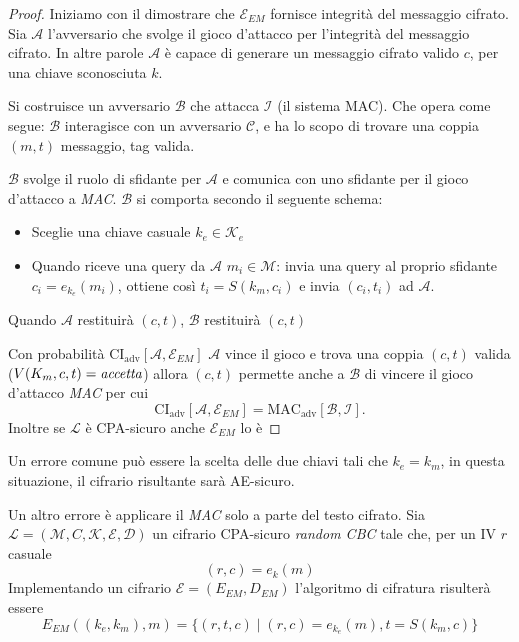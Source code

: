 \begin{proof}
    Iniziamo con il dimostrare che $\mathcal{E}_{EM}$ fornisce integrità del messaggio cifrato. Sia $\mathcal{A}$ l'avversario che svolge il gioco d'attacco per l'integrità del messaggio cifrato. In altre parole $\mathcal{A}$ è capace di generare un messaggio cifrato valido $c$, per una chiave sconosciuta $k$.
    
    \vspace{1em}
    Si costruisce un avversario $\mathcal{B}$ che attacca $\mathcal{I}$ (il sistema MAC). Che opera come segue:
    $\mathcal{B}$ interagisce con un avversario $\mathcal{C}$, e ha lo scopo di trovare una coppia $(m,t)$ messaggio, tag valida.

    \vspace{1em}
    $\mathcal{B}$ svolge il ruolo di sfidante per $\mathcal{A}$ e comunica con uno sfidante per il gioco d'attacco a \emph{MAC}. $\mathcal{B}$ si comporta secondo il seguente schema:  
    
    \begin{itemize}
        \item Sceglie una chiave casuale $k_e \in \mathcal{K}_e$ 
        \item Quando riceve una query da $\mathcal{A}$ $m_i \in \mathcal{M}$: invia una query al proprio sfidante
        $c_i = e_{k_e}(m_i)$, ottiene così $t_i = S(k_m,c_i)$ e invia $(c_i,t_i)$ ad $\mathcal{A}$.
    \end{itemize}
    Quando $\mathcal{A}$ restituirà $(c,t)$, $\mathcal{B}$ restituirà $(c,t)$

    Con probabilità $\text{CI}_\text{adv}[\mathcal{A},\mathcal{E}_{EM}]$ $\mathcal{A}$ vince il gioco e trova una coppia $(c,t)$ valida ($V(K_m,c,t) = \emph{accetta}$) allora $(c,t)$ permette anche a $\mathcal{B}$ di vincere il gioco d'attacco \emph{MAC} per cui
    \[
        \text{CI}_\text{adv}[\mathcal{A},\mathcal{E}_{EM}] = \text{MAC}_\text{adv}[\mathcal{B},\mathcal{I}].
    \]
    Inoltre se $\mathcal{L}$ è CPA-sicuro anche $\mathcal{E}_{EM}$ lo è
\end{proof}

\vspace{1em}\noindent
Un errore comune può essere la scelta delle due chiavi tali che $k_e = k_m$, in questa situazione, il cifrario risultante sarà AE-sicuro.

Un altro errore è applicare il \emph{MAC} solo a parte del testo cifrato. Sia $\mathcal{L} = (\mathcal{M},C,\mathcal{K},\mathcal{E},\mathcal{D})$ un cifrario CPA-sicuro \emph{random CBC} tale che, per un IV $r$ casuale  
\[
    (r,c) = e_k(m)
\]
Implementando un cifrario $\mathcal{E} = (E_{EM},D_{EM})$ l'algoritmo di cifratura risulterà essere
\[
    E_{EM}( (k_e,k_m),m) = \{ (r,t,c) \mid (r,c) = e_{k_e}(m), t = S(k_m,c)\}
\]

